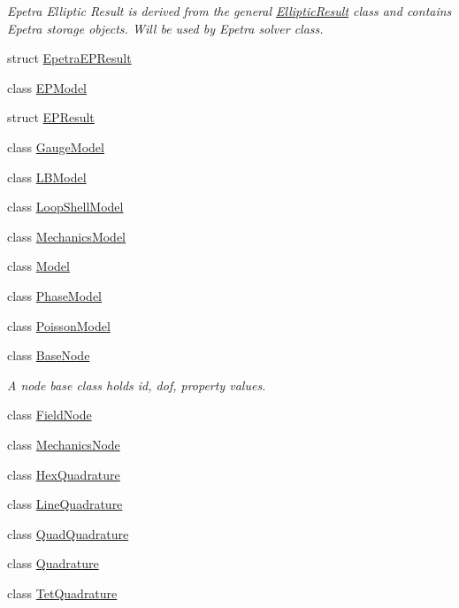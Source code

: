 \begin{DoxyCompactItemize}
\begin{DoxyCompactList}\small\item\em Epetra Elliptic Result is derived from the general \hyperlink{structvoom_1_1_elliptic_result}{EllipticResult} class and contains Epetra storage objects. Will be used by Epetra solver class. \item\end{DoxyCompactList}\item 
struct \hyperlink{structvoom_1_1_epetra_e_p_result}{EpetraEPResult}
\item 
class \hyperlink{classvoom_1_1_e_p_model}{EPModel}
\item 
struct \hyperlink{structvoom_1_1_e_p_result}{EPResult}
\item 
class \hyperlink{classvoom_1_1_gauge_model}{GaugeModel}
\item 
class \hyperlink{classvoom_1_1_l_b_model}{LBModel}
\item 
class \hyperlink{classvoom_1_1_loop_shell_model}{LoopShellModel}
\item 
class \hyperlink{classvoom_1_1_mechanics_model}{MechanicsModel}
\item 
class \hyperlink{classvoom_1_1_model}{Model}
\item 
class \hyperlink{classvoom_1_1_phase_model}{PhaseModel}
\item 
class \hyperlink{classvoom_1_1_poisson_model}{PoissonModel}
\item 
class \hyperlink{classvoom_1_1_base_node}{BaseNode}
\begin{DoxyCompactList}\small\item\em A node base class holds id, dof, property values. \item\end{DoxyCompactList}\item 
class \hyperlink{classvoom_1_1_field_node}{FieldNode}
\item 
class \hyperlink{classvoom_1_1_mechanics_node}{MechanicsNode}
\item 
class \hyperlink{classvoom_1_1_hex_quadrature}{HexQuadrature}
\item 
class \hyperlink{classvoom_1_1_line_quadrature}{LineQuadrature}
\item 
class \hyperlink{classvoom_1_1_quad_quadrature}{QuadQuadrature}
\item 
class \hyperlink{classvoom_1_1_quadrature}{Quadrature}
\item 
class \hyperlink{classvoom_1_1_tet_quadrature}{TetQuadrature}
\item 

\end{DoxyCompactItemize}
